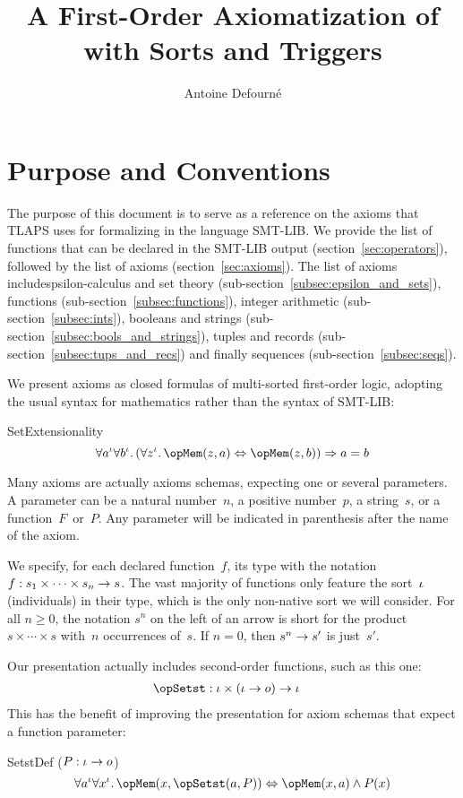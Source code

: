 \documentclass[11pt, a4paper, oneside]{article}
\title{A First-Order Axiomatization of \TLA with Sorts and Triggers}
\author{Antoine Defourné}
\date{}
\begin{document}
\pagestyle{empty}

\section{Purpose and Conventions}

The purpose of this document is to serve as a reference on the axioms that TLAPS uses for formalizing \TLA in the language SMT-LIB.  We provide the list of functions that can be declared in the SMT-LIB output (section~\ref{sec:operators}), followed by the list of axioms (section~\ref{sec:axioms}).  The list of axioms includespsilon-calculus and set theory (sub-section~\ref{subsec:epsilon_and_sets}), functions (sub-section~\ref{subsec:functions}), integer arithmetic (sub-section~\ref{subsec:ints}), booleans and strings (sub-section~\ref{subsec:bools_and_strings}), tuples and records (sub-section~\ref{subsec:tups_and_recs}) and finally sequences (sub-section~\ref{subsec:seqs}).

We present axioms as closed formulas of multi-sorted first-order logic, adopting the usual syntax for mathematics rather than the syntax of SMT-LIB:
\begin{axioms}
\item[SetExtensionality] \[
        \forall a^\idv \forall b^\idv.\, (\forall z^\idv.\, \opMem(z, a) \eqv \opMem(z, b)) \imp a = b
    \]

\end{axioms}

Many axioms are actually axioms schemas, expecting one or several parameters.  A parameter can be a natural number~$n$, a positive number~$p$, a string~$s$, or a function~$F$~or~$P$.  Any parameter will be indicated in parenthesis after the name of the axiom.

We specify, for each declared function~$f$, its type with the notation $f : s_1 \times \cdots \times s_n \rightarrow s$.  The vast majority of functions only feature the sort~$\iota$ (individuals) in their type, which is the only non-native sort we will consider.  For all $n \ge 0$, the notation $s^n$ on the left of an arrow is short for the product $s \times \cdots \times s$ with~$n$ occurrences of~$s$.  If $n = 0$, then $s^n \rightarrow s'$ is just~$s'$.

Our presentation actually includes second-order functions, such as this one:
\begin{align*}
    \opSetst &: \idv \times (\idv \arr o) \arr \idv
\end{align*}
This has the benefit of improving the presentation for axiom schemas that expect a function parameter:
\begin{axioms}
\item[SetstDef ($P : \iota \rightarrow o$)] \[
        \forall a^\idv \forall x^\idv.\, \opMem(x, \opSetst(a, P)) \eqv \opMem(x, a) \wedge P(x)
    \]

\end{axioms}
\end{document}
